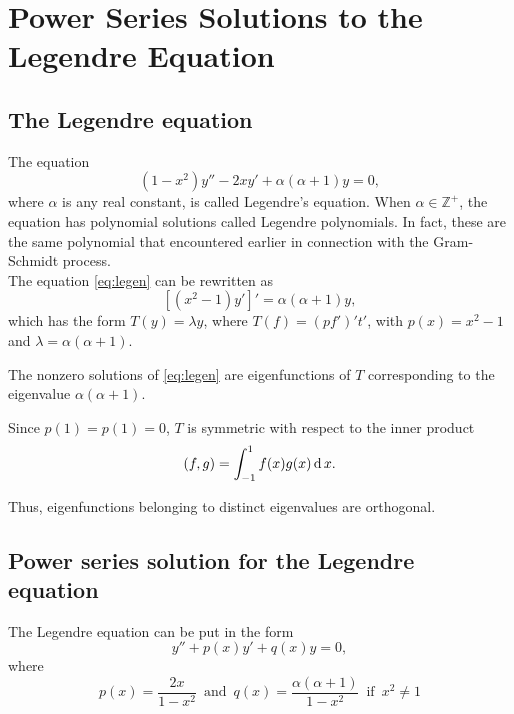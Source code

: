 \documentclass[../main-sheet.tex]{subfiles}
\begin{document}
\chapter{Power Series Solutions to the Legendre Equation}
\section{The Legendre equation}
The equation
\begin{equation}
    \left(1 - x^2\right)y'' - 2xy' + \alpha(\alpha + 1)y = 0, \label{eq:legen}
\end{equation}
where $ \alpha $ is any real constant, is called Legendre's equation.
When $ \alpha\in\mathbb{Z}^{+}$, the equation has polynomial solutions called
Legendre polynomials. In fact, these are the same polynomial that encountered earlier in connection with the Gram-Schmidt process.\\
The equation \eqref{eq:legen} can be rewritten as
\[
    \left[\left(x^2 - 1\right)y'\right]' = \alpha(\alpha + 1)y,
\]
which has the form $ T (y) = \lambda y $, where $ T (f ) = (pf')'t' $, with
$ p(x ) = x^2 - 1 $ and $ \lambda = \alpha(\alpha + 1) $.
\begin{note}
    The nonzero solutions of \eqref{eq:legen} are eigenfunctions of $ T $
    corresponding to the eigenvalue $ \alpha(\alpha + 1). $
\end{note}

Since $ p(1) = p( 1) = 0 $, $ T $ is symmetric with respect to the inner product
\[
    (f,g) =\int_{-1}^1 f (x )g (x )\,\mathrm{d}\, x.
\]

Thus, eigenfunctions belonging to distinct eigenvalues are orthogonal.
\section{Power series solution for the Legendre equation}
The Legendre equation can be put in the form
\[
    y'' + p(x )y' + q(x )y = 0,
\]
where
\[
    p(x) =\frac{2x}{1-x^2}\, \text{ and }\, q(x ) =\frac{\alpha(\alpha + 1)}{1-x^2}\, \text{ if }\, x^2\neq 1
\]
 
\end{document}
